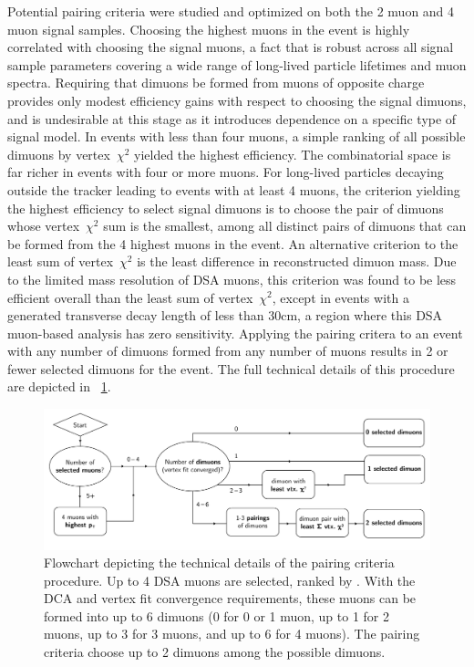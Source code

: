 Potential pairing criteria were studied and optimized on both the 2 muon and 4 muon signal samples.
Choosing the highest \pT muons in the event is highly correlated with choosing the signal muons, a fact that is robust across all signal sample parameters covering a wide range of long-lived particle lifetimes and muon \pT spectra.
Requiring that dimuons be formed from muons of opposite charge provides only modest efficiency gains with respect to choosing the signal dimuons, and is undesirable at this stage as it introduces dependence on a specific type of signal model.
In events with less than four muons, a simple ranking of all possible dimuons by vertex~$\chi^2$ yielded the highest efficiency.
The combinatorial space is far richer in events with four or more muons.
For long-lived particles decaying outside the tracker leading to events with at least 4 muons, the criterion yielding the highest efficiency to select signal dimuons is to choose the pair of dimuons whose vertex~$\chi^2$ sum is the smallest, among all distinct pairs of dimuons that can be formed from the 4 highest \pT muons in the event. 
An alternative criterion to the least sum of vertex~$\chi^2$ is the least difference in reconstructed dimuon mass.
Due to the limited mass resolution of DSA muons, this criterion was found to be less efficient overall than the least sum of vertex~$\chi^2$, except in events with a generated transverse decay length of less than 30\unit{cm}, a region where this DSA muon-based analysis has zero sensitivity.
Applying the pairing critera to an event with any number of dimuons formed from any number of muons results in 2 or fewer selected dimuons for the event.
The full technical details of this procedure are depicted in \Fig~\ref{fig:dd:pca}.

\begin{figure}[htpb]
  \centering
  \includegraphics[width=\textwidth]{figures/displaced/PairingCriteriaAlgorithm.pdf}
  \caption{Flowchart depicting the technical details of the pairing criteria procedure. Up to 4 DSA muons are selected, ranked by \pT. With the DCA and vertex fit convergence requirements, these muons can be formed into up to 6 dimuons (0 for 0 or 1 muon, up to 1 for 2 muons, up to 3 for 3 muons, and up to 6 for 4 muons). The pairing criteria choose up to 2 dimuons among the possible dimuons.}
  \label{fig:dd:pca}
\end{figure}


